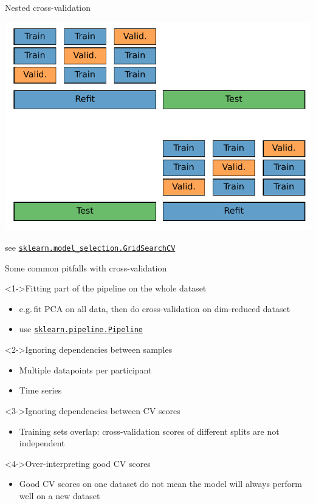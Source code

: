 \documentclass[presentation,mathserif,table]{beamer}
\newcommand{\eg}{e.g.\,}
\begin{document}
\begin{frame}[label={sec:org6fd0279},fragile]{Nested cross-validation}
 \begin{center}
\includegraphics[width=.9\linewidth]{figures/generated/train_eval_test/cv.pdf}
\end{center}
see  \href{https://scikit-learn.org/stable/modules/generated/sklearn.model\_selection.GridSearchCV.html}{\texttt{sklearn.model\_selection.GridSearchCV}}
\end{frame}
\begin{frame}[label={sec:orgea410c7},fragile]{Some common pitfalls with cross-validation}
 \begin{block}<1->{Fitting part of the pipeline on the whole dataset}
\begin{itemize}
\item \eg fit PCA on all data, then do cross-validation on dim-reduced dataset
\item use  \href{https://scikit-learn.org/stable/modules/generated/sklearn.pipeline.Pipeline.html}{\texttt{sklearn.pipeline.Pipeline}}
\end{itemize}
\end{block}
\begin{block}<2->{Ignoring dependencies between samples}
\begin{itemize}
\item Multiple datapoints per participant
\item Time series
\end{itemize}
\end{block}
\begin{block}<3->{Ignoring dependencies between CV scores}
\begin{itemize}
\item Training sets overlap: cross-validation scores of different splits are not independent
\end{itemize}
\end{block}
\begin{block}<4->{Over-interpreting good CV scores}
\begin{itemize}
\item Good CV scores on one dataset do not mean the model will always perform well on a new dataset
\end{itemize}
\end{block}
\end{frame}
\end{document}

